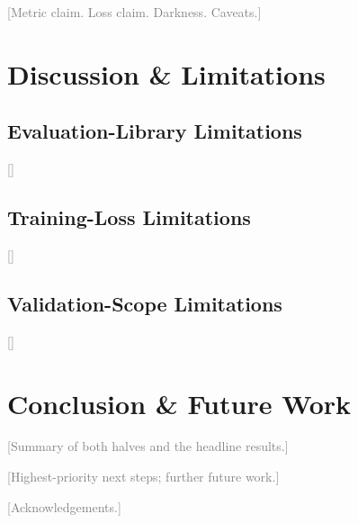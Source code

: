 \documentclass[sigconf]{acmart}
\newcommand{\tbd}[1]{\textcolor{gray}{[#1]}}
\begin{document}
\begin{table}
  \caption{Conventional (CE+Dice, mIoU-selected) vs.\ joint-loss model on the same test tiles.}
  \label{tab:baseline-test}
\end{table}

\begin{table}
  \caption{Road intersections on SpaceNet test tiles, micro-averaged.}
  \label{tab:baseline-points}
\end{table}

\tbd{Metric claim. Loss claim. Darkness. Caveats.}

\section{Discussion \& Limitations}
\label{sec:discussion}

\subsection{Evaluation-Library Limitations}
\tbd{}

\subsection{Training-Loss Limitations}
\tbd{}

\subsection{Validation-Scope Limitations}
\tbd{}

\section{Conclusion \& Future Work}
\label{sec:conclusion}

\tbd{Summary of both halves and the headline results.}

\tbd{Highest-priority next steps; further future work.}

\begin{acks}
\tbd{Acknowledgements.}
\end{acks}
\end{document}
